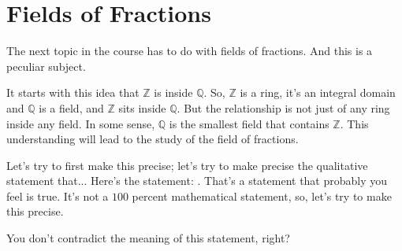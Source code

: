 \section{Fields of Fractions}

\begin{speech}[00:13:48 - 00:15:30]
The next topic in the course has to do with fields of fractions.  And this is a peculiar subject.

It starts with this idea that $\mathbb{Z}$ is inside $\mathbb{Q}$.  So, $\mathbb{Z}$ is a ring, it's an integral domain  and $\mathbb{Q}$ is a field,  and $\mathbb{Z}$ sits inside $\mathbb{Q}$. But the relationship is not just of any ring inside any field. In some sense, $\mathbb{Q}$ is the smallest field that contains $\mathbb{Z}$. This understanding will lead to the study of the field of fractions.

Let's try to first make this precise; let's try to make precise the qualitative statement that...  Here's the statement: . That's a statement that probably you feel is true. It's not a $100$ percent mathematical statement, so, let's try to make this precise.

You don't contradict the meaning of this statement, right?
\end{speech}

